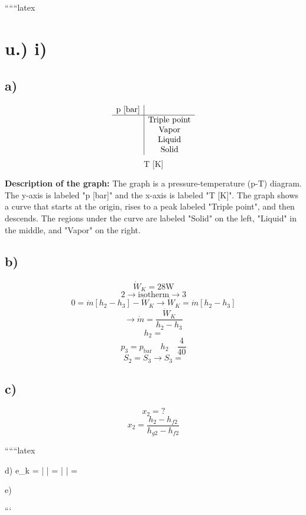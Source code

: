 
``````latex

\section*{u.) i)}

\subsection*{a)}
\[
\begin{array}{c|c}
\text{p [bar]} & \\
\hline
& \text{Triple point} \\
& \text{Vapor} \\
& \text{Liquid} \\
& \text{Solid} \\
\end{array}
\]
\[
\text{T [K]}
\]

\textbf{Description of the graph:} The graph is a pressure-temperature (p-T) diagram. The y-axis is labeled "p [bar]" and the x-axis is labeled "T [K]". The graph shows a curve that starts at the origin, rises to a peak labeled "Triple point", and then descends. The regions under the curve are labeled "Solid" on the left, "Liquid" in the middle, and "Vapor" on the right.

\subsection*{b)}
\[
\dot{W}_K = 28 \text{W}
\]
\[
2 \rightarrow \text{isotherm} \rightarrow 3
\]
\[
0 = \dot{m} [h_2 - h_3] - \dot{W}_K \rightarrow \dot{W}_K = \dot{m} [h_2 - h_3]
\]
\[
\rightarrow \dot{m} = \frac{\dot{W}_K}{h_2 - h_3}
\]
\[
h_2 = 
\]
\[
p_3 = p_{\text{bar}} \quad h_2 \quad \frac{4}{40}
\]
\[
S_2 = S_3 \rightarrow S_3 = 
\]

\subsection*{c)}
\[
x_2 = ?
\]
\[
x_2 = \frac{h_2 - h_{f2}}{h_{g2} - h_{f2}}
\]

``````latex

d) \quad e_k = \left|  \right| = \left|  \right| =

e)

```